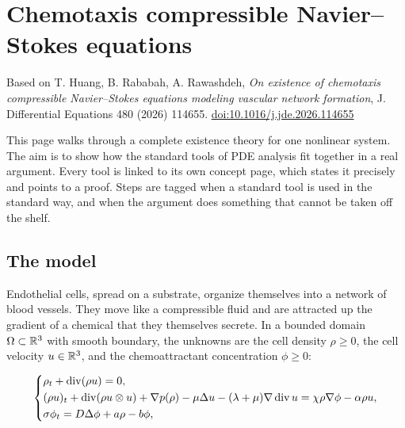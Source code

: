 
\chapter{Chemotaxis compressible Navier--Stokes equations}\label{p:case-chemotaxis}

\begin{byline}Based on T. Huang, B. Rababah, A. Rawashdeh, \emph{On existence of chemotaxis compressible Navier--Stokes equations modeling vascular network formation}, J. Differential Equations 480 (2026) 114655. \href{https://doi.org/10.1016/j.jde.2026.114655}{doi:10.1016/j.jde.2026.114655}\end{byline}

This page walks through a complete existence theory for one nonlinear system. The aim is to show how the standard tools of PDE analysis fit together in a real argument. Every tool is linked to its own concept page, which states it precisely and points to a proof. Steps are tagged \routine{} when a standard tool is used in the standard way, and \newidea{} when the argument does something that cannot be taken off the shelf.


\section{The model}

Endothelial cells, spread on a substrate, organize themselves into a network of blood vessels. They move like a compressible fluid and are attracted up the gradient of a chemical that they themselves secrete. In a bounded domain $\Omega \subset \mathbb{R}^3$ with smooth boundary, the unknowns are the cell density $\rho \ge 0$, the cell velocity $u \in \mathbb{R}^3$, and the chemoattractant concentration $\phi \ge 0$:

\begin{equation}\label{eq:system}
  \left\{
  \begin{aligned}
    &\rho_t + \dv(\rho u) = 0, \\
    &(\rho u)_t + \dv(\rho u \otimes u) + \nabla p(\rho) - \mu \Delta u - (\lambda+\mu)\nabla \dv u
       = \chi \rho \nabla \phi - \alpha \rho u, \\
    &\sigma \phi_t = D \Delta \phi + a \rho - b \phi,
  \end{aligned}
  \right.
  \end{equation}

